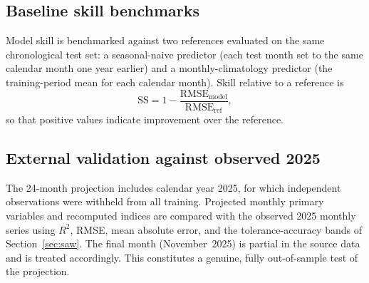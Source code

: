 \documentclass[pdflatex,sn-basic,lineno]{sn-jnl}
\begin{document}
\subsection{Baseline skill benchmarks}\label{sec:baselines}
Model skill is benchmarked against two references evaluated on the same
chronological test set: a seasonal-naive predictor (each test month set to the
same calendar month one year earlier) and a monthly-climatology predictor (the
training-period mean for each calendar month). Skill relative to a reference is
\begin{equation}
\mathrm{SS}=1-\frac{\mathrm{RMSE}_{\text{model}}}{\mathrm{RMSE}_{\text{ref}}},
\label{eq:skill}
\end{equation}
so that positive values indicate improvement over the reference.

\subsection{External validation against observed 2025}\label{sec:validation}
The 24-month projection includes calendar year 2025, for which independent
observations were withheld from all training. Projected monthly primary
variables and recomputed indices are compared with the observed 2025 monthly
series using $R^{2}$, RMSE, mean absolute error, and the tolerance-accuracy
bands of Section~\ref{sec:saw}. The final month (November~2025) is partial in the
source data and is treated accordingly. This constitutes a genuine, fully
out-of-sample test of the projection.
\end{document}
